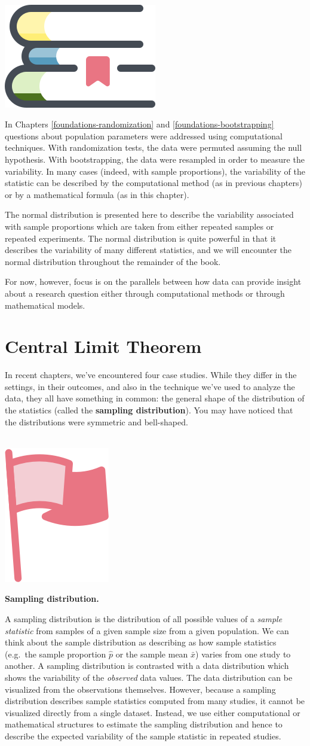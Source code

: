 \documentclass[
  10pt,
  openany]{book}
\newenvironment{mdframedwithfootChapterintro}
{   
    \savenotes
    \begin{mdframed}[%
    topline=true, bottomline=true, linecolor=oiB, linewidth=1.4pt,
    rightline=false, leftline=false,
    backgroundcolor=oiLB]
    \renewcommand{\thempfootnote}{\arabic{footnote}}
    }
{
    \end{mdframed}
    \spewnotes
}
\newenvironment{mdframedwithfootImportant}
{   
    \savenotes
    \begin{mdframed}[%
    topline=true, bottomline=true, linecolor=oiR, linewidth=0.5pt,
    rightline=false, leftline=false,
    backgroundcolor=oiLGray]
    \renewcommand{\thempfootnote}{\arabic{footnote}}
    }
{
    \end{mdframed}
    \spewnotes
}
\newenvironment{chapterintro}{
\vspace{4mm}
\begin{mdframedwithfootChapterintro}
\begin{minipage}[t]{0.10\textwidth}
{$\:$ \\ \setkeys{Gin}{width=2.5em,keepaspectratio}\includegraphics{images/_icons/chapterintro.png}}
\end{minipage}
\hfill
\begin{minipage}[t]{0.90\textwidth}
\setlength{\parskip}{1em}
\large
}{\end{minipage}
\end{mdframedwithfootChapterintro}
\vspace{4mm}
}
\newenvironment{important}{
    \let\oldtextbf\textbf
    \renewcommand{\textbf}[1]{{\textcolor{oiR}{\oldtextbf{##1}}}}
\vspace{4mm}
\begin{mdframedwithfootImportant}
\begin{minipage}[t]{0.10\textwidth}
{$\:$ \\ \setkeys{Gin}{width=2.5em,keepaspectratio}\includegraphics{images/_icons/important.png}}
\end{minipage}
\hfill
\begin{minipage}[t]{0.90\textwidth}
\vspace{-2mm}
\setlength{\parskip}{1em}
}{\end{minipage}
\end{mdframedwithfootImportant}
\vspace{4mm}
}
\begin{document}
\begin{chapterintro}
In Chapters \ref{foundations-randomization} and \ref{foundations-bootstrapping} questions about population parameters were addressed using computational techniques.
With randomization tests, the data were permuted assuming the null hypothesis.
With bootstrapping, the data were resampled in order to measure the variability.
In many cases (indeed, with sample proportions), the variability of the statistic can be described by the computational method (as in previous chapters) or by a mathematical formula (as in this chapter).

The normal distribution is presented here to describe the variability associated with sample proportions which are taken from either repeated samples or repeated experiments.
The normal distribution is quite powerful in that it describes the variability of many different statistics, and we will encounter the normal distribution throughout the remainder of the book.

For now, however, focus is on the parallels between how data can provide insight about a research question either through computational methods or through mathematical models.

\end{chapterintro}

\hypertarget{CLTsection}{%
\section{Central Limit Theorem}\label{CLTsection}}

In recent chapters, we've encountered four case studies.
While they differ in the settings, in their outcomes, and also in the technique we've used to analyze the data, they all have something in common: the general shape of the distribution of the statistics (called the \textbf{sampling distribution}). You may have noticed that the distributions were symmetric and bell-shaped.

\begin{important}
\textbf{Sampling distribution.}

A sampling distribution is the distribution of all possible values of a \emph{sample statistic} from samples of a given sample size from a given population.
We can think about the sample distribution as describing as how sample statistics (e.g.~the sample proportion \(\hat{p}\) or the sample mean \(\bar{x}\)) varies from one study to another.
A sampling distribution is contrasted with a data distribution which shows the variability of the \emph{observed} data values.
The data distribution can be visualized from the observations themselves.
However, because a sampling distribution describes sample statistics computed from many studies, it cannot be visualized directly from a single dataset.
Instead, we use either computational or mathematical structures to estimate the sampling distribution and hence to describe the expected variability of the sample statistic in repeated studies.

\end{important}
\end{document}
